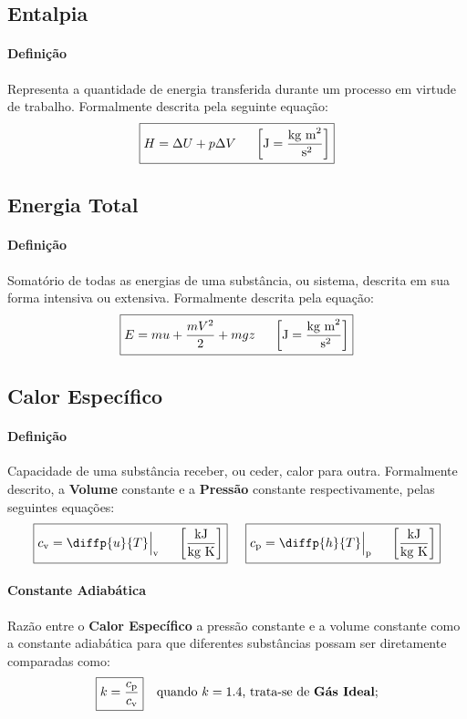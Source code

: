 \documentclass{article}
\begin{document}
        \subsection{Entalpia}
            \paragraph{Definição}Representa a quantidade de energia transferida durante um processo em virtude de trabalho. Formalmente descrita pela seguinte equação:
                \[\boxed{H = \Delta U + p\Delta V \hspace{5mm} \left[\text{J} = \frac{\text{kg m}^{2}}{\text{ s}^{2}}\right]}\]

        \subsection{Energia Total}
            \paragraph{Definição}Somatório de todas as energias de uma substância, ou sistema, descrita em sua forma intensiva ou extensiva. Formalmente descrita pela equação:
                \[\boxed{E = mu + \frac{m V^{2}}{2} + mgz \hspace{5mm} \left[\text{J} = \frac{\text{kg m}^{2}}{\text{ s}^{2}}\right]}\]

        \subsection{Calor Específico}
            \paragraph{Definição}Capacidade de uma substância receber, ou ceder, calor para outra. Formalmente descrito, a \textbf{Volume} constante e a \textbf{Pressão} constante respectivamente, pelas seguintes equações:
                \[
                    \boxed{c_{\text{v}} = \diffp{u}{T}\Big|_{\text{v}} \hspace{5mm} \left[\frac{\text{kJ}}{\text{kg K}}\right]} \hspace{5mm}
                    \boxed{c_{\text{p}} = \diffp{h}{T}\Big|_{\text{p}} \hspace{5mm} \left[\frac{\text{kJ}}{\text{kg K}}\right]}
                \]

            \paragraph{Constante Adiabática}Razão entre o \textbf{Calor Específico} a pressão constante e a volume constante como a constante adiabática para que diferentes substâncias possam ser diretamente comparadas como:
                \[
                    \boxed{k = \frac{c_{\text{p}}}{c_{\text{v}}}}
                    \hspace{2,5mm}
                    \text{ quando $k = 1.4$, trata-se de \textbf{Gás Ideal};}\]
\end{document}
